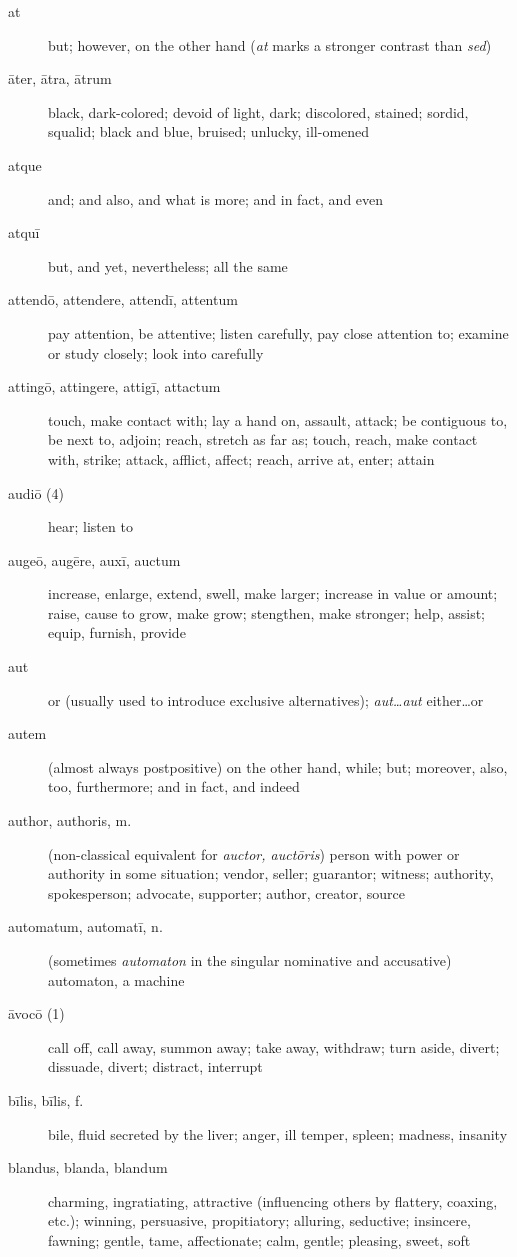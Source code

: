\begin{description}
    \item[at] \marginnote{*}but; however, on the other hand (\textit{at} marks a stronger contrast than \textit{sed})
    \item[āter, ātra, ātrum] black, dark-colored; devoid of light, dark; discolored, stained; sordid, squalid; black and blue, bruised; unlucky, ill-omened
    \item[atque] \marginnote{*}and; and also, and what is more; and in fact, and even
    \item[atquī] but, and yet, nevertheless; all the same
    \item[attendō, attendere, attendī, attentum] pay attention, be attentive; listen carefully, pay close attention to; examine or study closely; look into carefully
    \item[attingō, attingere, attigī, attactum] touch, make contact with; lay a hand on, assault, attack; be contiguous to, be next to, adjoin; reach, stretch as far as; touch, reach, make contact with, strike; attack, afflict, affect; reach, arrive at, enter; attain
    \item[audiō (4)] \marginnote{*}hear; listen to
    \item[augeō, augēre, auxī, auctum] \marginnote{*}increase, enlarge, extend, swell, make larger; increase in value or amount; raise, cause to grow, make grow; stengthen, make stronger; help, assist; equip, furnish, provide
    \item[aut] \marginnote{*}or (usually used to introduce exclusive alternatives); \textit{aut\dots aut} either\dots or
    \item[autem] \marginnote{*}(almost always postpositive) on the other hand, while; but; moreover, also, too, furthermore; and in fact, and indeed
    \item[author, authoris, m.] (non-classical equivalent for \textit{auctor, auctōris}) person with power or authority in some situation; vendor, seller; guarantor; witness; authority, spokesperson; advocate, supporter; author, creator, source
    \item[automatum, automatī, n.] (sometimes \textit{automaton} in the singular nominative and accusative) automaton, a machine
    \item[āvocō (1)] call off, call away, summon away; take away, withdraw; turn aside, divert; dissuade, divert; distract, interrupt
    \item[bīlis, bīlis, f.]  bile, fluid secreted by the liver; anger, ill temper, spleen; madness, insanity
    \item[blandus, blanda, blandum] charming, ingratiating, attractive (influencing others by flattery, coaxing, etc.); winning, persuasive, propitiatory; alluring, seductive; insincere, fawning; gentle, tame, affectionate; calm, gentle; pleasing, sweet, soft

\end{description}
